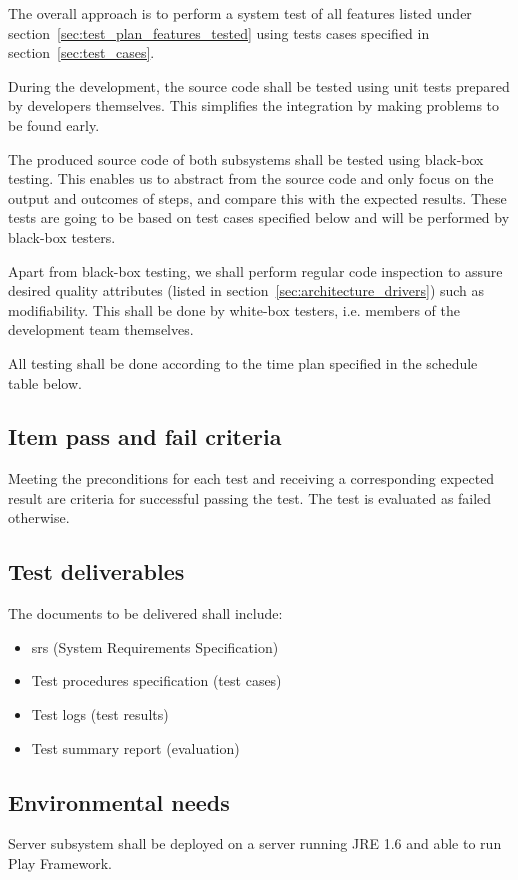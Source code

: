 \documentclass[11pt]{book}
\begin{document}
The overall approach is to perform a system test of all features listed under section~\ref{sec:test_plan_features_tested} using tests cases specified in section~\ref{sec:test_cases}.

During the development, the source code shall be tested using unit tests prepared by developers themselves. This simplifies the integration by making problems to be found early.

The produced source code of both subsystems shall be tested using black-box testing. This enables us to abstract from the source code and only focus on the output and outcomes of steps, and compare this with the expected results. These tests are going to be based on test cases specified below and will be performed by black-box testers.

Apart from black-box testing, we shall perform regular code inspection to assure desired quality attributes (listed in section~\ref{sec:architecture_drivers}) such as modifiability. This shall be done by white-box testers, i.e. members of the development team themselves.

All testing shall be done according to the time plan specified in the schedule table below.

\subsection{Item pass and fail criteria}
Meeting the preconditions for each test and receiving a corresponding expected result are criteria for successful passing the test. The test is evaluated as failed otherwise.

\subsection{Test deliverables}
The documents to be delivered shall include:

\begin{itemize}
    \item \gls{srs} (System Requirements Specification)
    \item Test procedures specification (test cases)
    \item Test logs (test results)
    \item Test summary report (evaluation)
\end{itemize}

\subsection{Environmental needs}
Server subsystem shall be deployed on a server running JRE 1.6 and able to run Play Framework.
\end{document}

